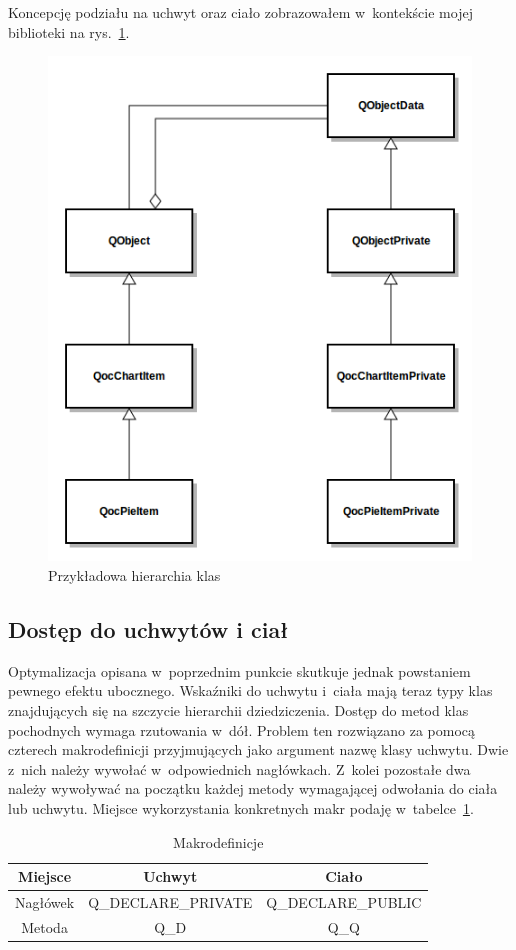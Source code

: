 Koncepcję podziału na uchwyt oraz ciało zobrazowałem w~kontekście mojej biblioteki na rys.~\ref{rys:dpointer}.
\begin{figure}
\centering
\caption{Przykładowa hierarchia klas}\label{rys:dpointer}
\includegraphics[scale=0.6]{img/dpointer.png}
\end{figure}

\subsection{Dostęp do uchwytów i ciał}
Optymalizacja opisana w~poprzednim punkcie skutkuje jednak powstaniem pewnego efektu ubocznego.
Wskaźniki do uchwytu i~ciała mają teraz typy klas znajdujących się na szczycie hierarchii dziedziczenia. Dostęp do metod klas pochodnych wymaga rzutowania w~dół. 
Problem ten rozwiązano za pomocą czterech makrodefinicji przyjmujących jako argument nazwę klasy uchwytu. Dwie z~nich należy wywołać w~odpowiednich nagłówkach. Z~kolei pozostałe dwa należy wywoływać na początku każdej metody wymagającej odwołania do ciała lub uchwytu. Miejsce wykorzystania konkretnych makr podaję w~tabelce~\ref{tab:makra}.

\begin{table}[h]\footnotesize
\centering
\caption{Makrodefinicje}
\label{tab:makra}
\begin{tabular}{|c|c|c|}
\hline
Miejsce & Uchwyt & Ciało\\
\hline
Nagłówek & Q\_DECLARE\_PRIVATE & Q\_DECLARE\_PUBLIC\\
\hline
Metoda & Q\_D & Q\_Q\\
\hline
\end{tabular}
\end{table}
